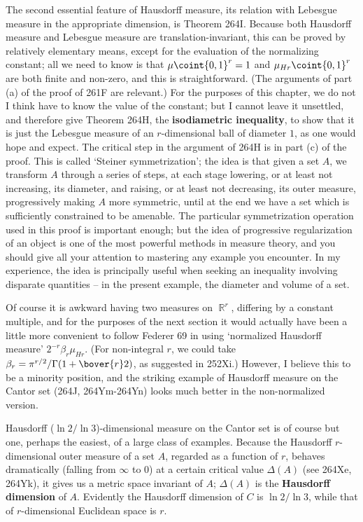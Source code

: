 {The second essential feature of Hausdorff measure, its relation with
Lebesgue measure in the appropriate dimension, is Theorem 264I.
Because both Hausdorff measure and Lebesgue measure are
translation-invariant, this can be proved by relatively elementary
means, except for the evaluation of the normalizing constant;  all we
need to know is that $\mu\coint{0,1}^r=1$ and
$\mu_{Hr}\coint{0,1}^r$ are both finite and non-zero, and this is
straightforward.   (The arguments of part (a) of the proof of 261F are
relevant.)   For the purposes of this chapter, we do not I think have to
know the value of the constant;  but I cannot leave it unsettled, and
therefore give Theorem 264H, the {\bf isodiametric inequality}, to show
that it is just the Lebesgue measure of an $r$-dimensional ball
of diameter $1$, as one would hope and expect.   The critical step in
the argument of 264H is in part (c) of the proof.   This is called
`Steiner symmetrization';  the idea is that given a set $A$, we
transform
$A$ through a series of steps, at each stage lowering, or at least not
increasing, its diameter, and raising, or at least not decreasing, its
outer measure, progressively making $A$ more symmetric, until at the end
we have a set which is sufficiently constrained to be amenable.   The
particular symmetrization operation used in this proof is important
enough;  but the idea of progressive regularization of an object is one
of the most powerful methods in measure theory, and you should give all
your attention to mastering any example you encounter.   In my
experience, the idea is principally useful when seeking an inequality
involving disparate quantities -- in the present example, the diameter
and volume of a set.

Of course it is awkward having two measures on $\BbbR^r$, differing by
a constant multiple, and for the purposes of the next section it would
actually have been a little more convenient to follow {\smc Federer 69}
in using `normalized Hausdorff measure' $2^{-r}\beta_r\mu_{Hr}$.
(For non-integral $r$, we could take
$\beta_r=\pi^{r/2}/\Gamma(1+\bover{r}2)$, as suggested in
252Xi.)   However, I believe this to be a minority position, and
the striking example of Hausdorff measure on the Cantor set (264J,
264Ym-264Yn) looks much better in the non-normalized version.

Hausdorff ($\ln 2/\ln 3$)-dimensional measure on the Cantor set is of
course but one, perhaps the easiest, of a large class of examples.
Because the Hausdorff
$r$-dimensional outer measure of a set $A$, regarded as a function of
$r$, behaves dramatically (falling from $\infty$ to $0$) at a certain
critical
value $\Delta(A)$ (see 264Xe, 264Yk), it gives us a metric space
invariant
of $A$;  $\Delta(A)$ is the {\bf Hausdorff dimension} of $A$.
Evidently the Hausdorff dimension of $C$ is $\ln 2/\ln 3$, while that of
$r$-dimensional Euclidean space is $r$.
}%

\discrpage


